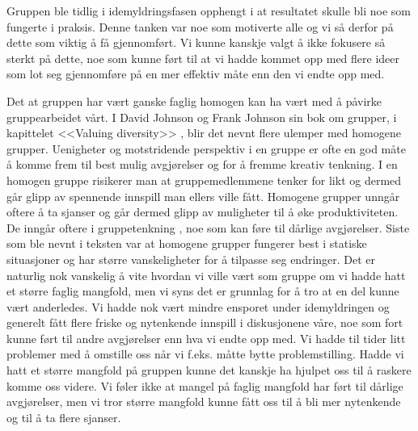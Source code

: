 Gruppen ble tidlig i idemyldringsfasen opphengt i at resultatet skulle bli noe som fungerte i praksis. Denne tanken var noe som motiverte alle og vi så derfor på dette som viktig å få gjennomført. Vi kunne kanskje valgt å ikke fokusere så sterkt på dette, noe som kunne ført til at vi hadde kommet opp med flere ideer som lot seg gjennomføre på en mer effektiv måte enn den vi endte opp med. 

Det at gruppen har vært ganske faglig homogen kan ha vært med å påvirke gruppearbeidet vårt. I David Johnson og Frank Johnson sin bok om grupper, i kapittelet <<Valuing diversity>> \cite[s. 452-453]{johnson_joining}, blir det nevnt flere ulemper med homogene grupper. Uenigheter og motstridende perspektiv i en gruppe er ofte en god måte å komme frem til best mulig avgjørelser og for å fremme kreativ tenkning. I en homogen gruppe risikerer man at gruppemedlemmene tenker for likt og dermed går glipp av spennende innspill man ellers ville fått. Homogene grupper unngår oftere å ta sjanser og går dermed glipp av muligheter til å øke produktiviteten. De inngår oftere i gruppetenkning \cite{groupthink}, noe som kan føre til dårlige avgjørelser. Siste som ble nevnt i teksten var at homogene grupper fungerer best i statiske situasjoner og har større vanskeligheter for å tilpasse seg endringer. Det er naturlig nok vanskelig å vite hvordan vi ville vært som gruppe om vi hadde hatt et større faglig mangfold, men vi syns det er grunnlag for å tro at en del kunne vært anderledes. Vi hadde nok vært mindre ensporet under idemyldringen og generelt fått flere friske og nytenkende innspill i diskusjonene våre, noe som fort kunne ført til andre avgjørelser enn hva vi endte opp med. Vi hadde til tider litt problemer med å omstille oss når vi f.eks. måtte bytte problemstilling. Hadde vi hatt et større mangfold på gruppen kunne det kanskje ha hjulpet oss til å raskere komme oss videre. Vi føler ikke at mangel på faglig mangfold har ført til dårlige avgjørelser, men vi tror større mangfold kunne fått oss til å bli mer nytenkende og til å ta flere sjanser. 

